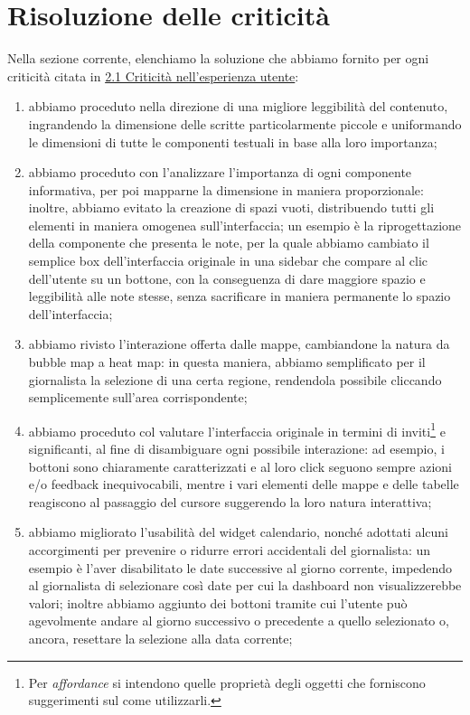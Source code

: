 \documentclass[../../main.tex]{subfiles}
\begin{document}
\section{Risoluzione delle criticità}
Nella sezione corrente, elenchiamo la soluzione che abbiamo fornito per ogni criticità citata in \hyperref[ss:criticita]{2.1 Criticità nell’esperienza utente}:
\begin{enumerate}
    \item [{\hyperref[el:1]{1.}}] abbiamo proceduto nella direzione di una migliore leggibilità del contenuto, ingrandendo la dimensione delle scritte particolarmente piccole e uniformando le dimensioni di tutte le componenti testuali in base alla loro importanza;
    \item [{\hyperref[el:2]{2.}}] abbiamo proceduto con l'analizzare l'importanza di ogni componente informativa, per poi mapparne la dimensione in maniera proporzionale: inoltre, abbiamo evitato la creazione di spazi vuoti, distribuendo tutti gli elementi in maniera omogenea sull'interfaccia; un esempio è la riprogettazione della componente che presenta le note, per la quale abbiamo cambiato il semplice box dell'interfaccia originale in una sidebar che compare al clic dell'utente su un bottone, con la conseguenza di dare maggiore spazio e leggibilità alle note stesse, senza sacrificare in maniera permanente lo spazio dell'interfaccia;
    \item [{\hyperref[el:3]{3.}}] abbiamo rivisto l'interazione offerta dalle mappe, cambiandone la natura da bubble map a heat map: in questa maniera, abbiamo semplificato per il giornalista la selezione di una certa regione, rendendola possibile cliccando semplicemente sull'area corrispondente;
    \item [{\hyperref[el:4]{4.}}] abbiamo proceduto col valutare l'interfaccia originale in termini di inviti\footnote{Per \textit{affordance} si intendono quelle proprietà degli oggetti che forniscono suggerimenti sul come utilizzarli.} e significanti, al fine di disambiguare ogni possibile interazione: ad esempio, i bottoni sono chiaramente caratterizzati e al loro click seguono sempre azioni e/o feedback inequivocabili, mentre i vari elementi delle mappe e delle tabelle reagiscono al passaggio del cursore suggerendo la loro natura interattiva;
    \item [{\hyperref[el:5]{5.}}] abbiamo migliorato l'usabilità del widget calendario, nonché adottati alcuni accorgimenti per prevenire o ridurre errori accidentali del giornalista: un esempio è l'aver disabilitato le date successive al giorno corrente, impedendo al giornalista di selezionare così date per cui la dashboard non visualizzerebbe valori; inoltre abbiamo aggiunto dei bottoni tramite cui l'utente può agevolmente andare al giorno successivo o precedente a quello selezionato o, ancora, resettare la selezione alla data corrente;

\end{enumerate}
\end{document}
